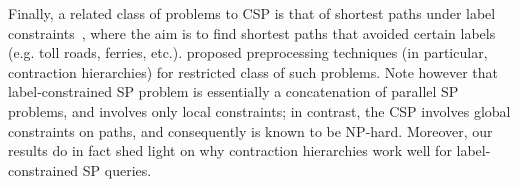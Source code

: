 Finally, a related class of problems to CSP is that of shortest paths under label constraints~\cite{language_csp}, where the aim is to find shortest paths that avoided certain labels (e.g. toll roads, ferries, etc.). \cite{rice_csp} proposed preprocessing techniques (in particular, contraction hierarchies) for restricted class of such problems. 
Note however that label-constrained SP problem is essentially a concatenation of parallel SP problems, and involves only local constraints; in contrast, the CSP involves global constraints on paths, and consequently is known to be NP-hard. 
Moreover, our results do in fact shed light on why contraction hierarchies work well for label-constrained SP queries.